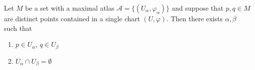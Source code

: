 \documentclass{article}
\numberwithin{equation}{section}
\begin{document}
\begin{lemma}
    Let $M$ be a set with a maximal atlas $\mathcal{A} = \{(U_\alpha, \varphi_\alpha)\}$ and suppose that $p,q \in M$ are distinct points contained in a single chart $(U,\varphi).$ Then there exists $\alpha,\beta$ such that 
    \begin{enumerate}
        \item $p\in U_\alpha$, $q\in U_\beta$
        \item $U_\alpha \cap U_\beta = \emptyset$
    \end{enumerate}
\end{lemma}
\end{document}

